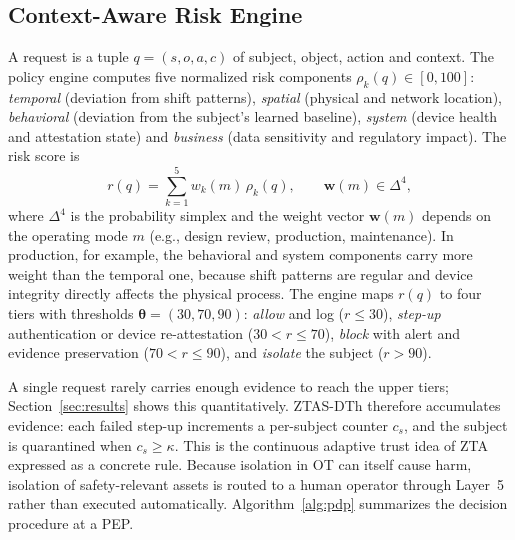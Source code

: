 \documentclass[journal]{IEEEtran}
\newcommand{\ztas}{ZTAS-DTh}
\begin{document}
\subsection{Context-Aware Risk Engine}
\label{sec:arch-risk}
A request is a tuple $q=(s,o,a,c)$ of subject, object, action and context. The policy engine computes five normalized risk components $\rho_k(q)\in[0,100]$: \emph{temporal} (deviation from shift patterns), \emph{spatial} (physical and network location), \emph{behavioral} (deviation from the subject's learned baseline), \emph{system} (device health and attestation state) and \emph{business} (data sensitivity and regulatory impact). The risk score is
\begin{equation}
r(q)=\sum_{k=1}^{5} w_k(m)\,\rho_k(q),\qquad \mathbf{w}(m)\in\Delta^4,
\label{eq:risk}
\end{equation}
where $\Delta^4$ is the probability simplex and the weight vector $\mathbf{w}(m)$ depends on the operating mode $m$ (e.g., design review, production, maintenance). In production, for example, the behavioral and system components carry more weight than the temporal one, because shift patterns are regular and device integrity directly affects the physical process. The engine maps $r(q)$ to four tiers with thresholds $\boldsymbol{\theta}=(30,70,90)$: \emph{allow} and log ($r\le30$), \emph{step-up} authentication or device re-attestation ($30<r\le70$), \emph{block} with alert and evidence preservation ($70<r\le90$), and \emph{isolate} the subject ($r>90$).

A single request rarely carries enough evidence to reach the upper tiers; Section~\ref{sec:results} shows this quantitatively. \ztas{} therefore accumulates evidence: each failed step-up increments a per-subject counter $c_s$, and the subject is quarantined when $c_s\ge\kappa$. This is the continuous adaptive trust idea of ZTA expressed as a concrete rule. Because isolation in OT can itself cause harm, isolation of safety-relevant assets is routed to a human operator through Layer~5 rather than executed automatically. Algorithm~\ref{alg:pdp} summarizes the decision procedure at a PEP.
\end{document}

